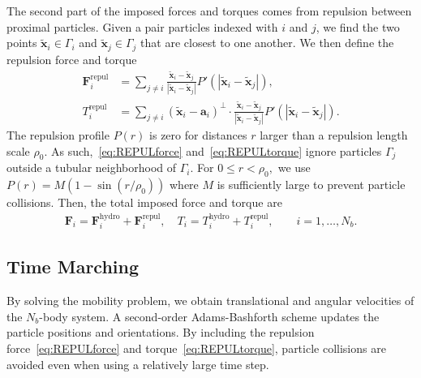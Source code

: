 \documentclass[lineno]{jfm}
\renewcommand{\aa}{\mathbf{a}}
\newcommand{\FF}{\mathbf{F}}
\newcommand{\xx}{\mathbf{x}}
\begin{document}
The second part of the imposed forces and torques comes from repulsion
between proximal particles. Given a pair particles indexed with $i$ and
$j$, we find the two points $\tilde{\xx}_i \in \Gamma_i$ and
$\tilde{\xx}_j \in \Gamma_j$ that are closest to one another. We then
define the repulsion force and torque
\begin{align}
  \label{eq:REPULforce}
  \FF_i^{\text{repul}} &= \sum_{j \neq i} 
    \frac{\tilde{\xx}_i - \tilde{\xx}_j}
    {|\tilde{\xx}_i - \tilde{\xx}_j|} 
    P'(|\tilde{\xx}_i - \tilde{\xx}_j|), \\
  \label{eq:REPULtorque}
  T_i^{\text{repul}} &= \sum_{j \neq i} 
    (\tilde{\xx}_i - \aa_i)^{\perp} \cdot 
    \frac{\tilde{\xx}_i - \tilde{\xx}_j}
    {|\tilde{\xx}_i - \tilde{\xx}_j|} 
    P'(|\tilde{\xx}_i - \tilde{\xx}_j|).
\end{align}
The repulsion profile $P(r)$ is zero for distances $r$ larger than a
repulsion length scale $\rho_0$. As such,~\eqref{eq:REPULforce}
and~\eqref{eq:REPULtorque} ignore particles $\Gamma_j$ outside a
tubular neighborhood of $\Gamma_i$. For $0 \leq r < \rho_0,$ we use
$P(r) = M(1 - \sin(r/\rho_0))$ where $M$ is sufficiently large to
prevent particle collisions. Then, the total imposed force and torque
are
\begin{align}
  \FF_i = \FF_i^{\text{hydro}} + \FF_i^{\text{repul}},\quad
  T_i = T_i^{\text{hydro}} + T_i^{\text{repul}}, \qquad
  i=1,\ldots,N_b.
\end{align}


\subsection{Time Marching}
By solving the mobility problem, we obtain translational and angular
velocities of the $N_b$-body system. A second-order Adams-Bashforth
scheme updates the particle positions and orientations. By including the
repulsion force~\eqref{eq:REPULforce} and
torque~\eqref{eq:REPULtorque}, particle collisions are avoided even
when using a relatively large time step. 



\end{document}
